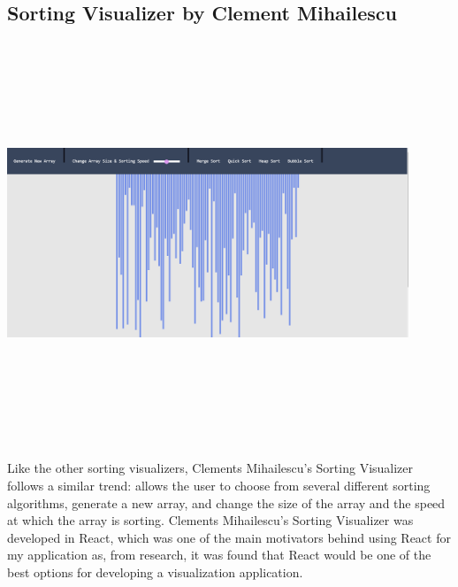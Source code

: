 \subsection{Sorting Visualizer by Clement Mihailescu}
\begin{center}
    \includegraphics[width=12cm,height=12cm,keepaspectratio]{images/sortvisclement}
\end{center}
Like the other sorting visualizers, Clements Mihailescu's Sorting Visualizer follows a similar trend: allows the user to choose from several different sorting algorithms, generate a new array, and change the size of the array and the speed at which the array is sorting. Clements Mihailescu's Sorting Visualizer was developed in React, which was one of the main motivators behind using React for my application as, from research, it was found that React would be one of the best options for developing a visualization application.

